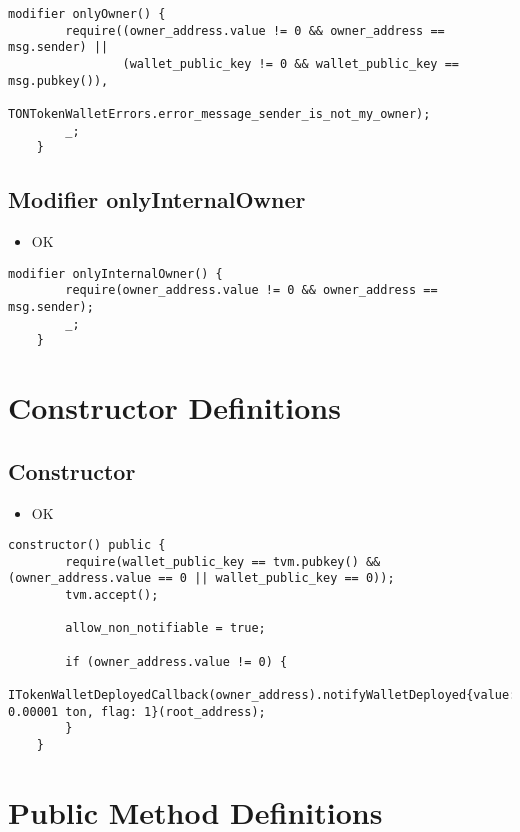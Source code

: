 \begin{lstlisting}[firstnumber=603]
    modifier onlyOwner() {
        require((owner_address.value != 0 && owner_address == msg.sender) ||
                (wallet_public_key != 0 && wallet_public_key == msg.pubkey()),
                TONTokenWalletErrors.error_message_sender_is_not_my_owner);
        _;
    }
\end{lstlisting}

\subsection{Modifier onlyInternalOwner}

\begin{itemize}
\item OK
\end{itemize}

\begin{lstlisting}[firstnumber=610]
    modifier onlyInternalOwner() {
        require(owner_address.value != 0 && owner_address == msg.sender);
        _;
    }
\end{lstlisting}

\section{Constructor Definitions}

\subsection{Constructor}

\begin{itemize}
\item OK
\end{itemize}

\begin{lstlisting}[firstnumber=43]
    constructor() public {
        require(wallet_public_key == tvm.pubkey() && (owner_address.value == 0 || wallet_public_key == 0));
        tvm.accept();

        allow_non_notifiable = true;

        if (owner_address.value != 0) {
            ITokenWalletDeployedCallback(owner_address).notifyWalletDeployed{value: 0.00001 ton, flag: 1}(root_address);
        }
    }
\end{lstlisting}

\section{Public Method Definitions}

